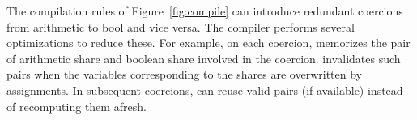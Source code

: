 The compilation rules of Figure~\ref{fig:compile} can introduce redundant coercions from arithmetic to
bool and vice versa.
The \tool compiler performs several optimizations to reduce these.
For example, on each coercion, \tool memorizes the pair of arithmetic share and boolean share involved in the coercion.
\tool invalidates such pairs when the variables corresponding to the shares are overwritten by assignments.
In subsequent coercions, \tool can reuse valid pairs (if available) instead of recomputing them afresh. 

 